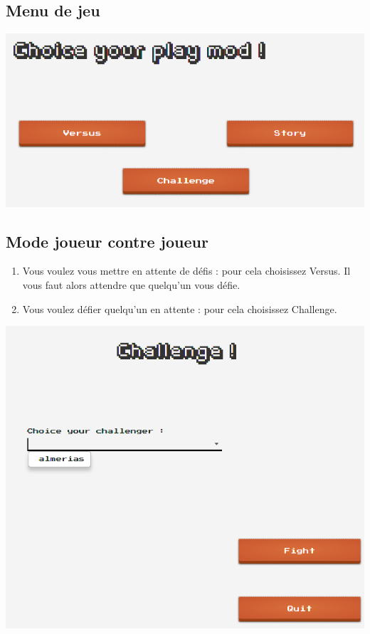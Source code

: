 \documentclass[a4paper,10pt]{report}
\begin{document}
\subsection{Menu de jeu}
\includegraphics[scale=0.3]{images/hub.png}

\subsection{Mode joueur contre joueur}
\begin{enumerate}
 \item Vous voulez vous mettre en attente de défis : pour cela choisissez Versus. Il vous faut alors attendre que quelqu'un vous défie.
 \item Vous voulez défier quelqu'un en attente : pour cela choisissez Challenge.
\end{enumerate}

\includegraphics[scale=0.3]{images/challenge.png}
\end{document}
